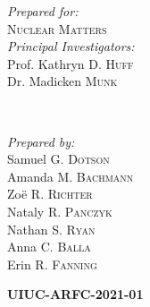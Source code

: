 \begin{titlepage}
       \begin{minipage}{0.45\textwidth}
               \begin{flushleft}
                       \large
                       \textit{Prepared for:}\\
                       \textsc{Nuclear Matters}%
                       \vspace{4mm}\\ %
                       \textit{Principal Investigators:}\\ %
                       Prof. Kathryn D. \textsc{Huff}\\ %
                       Dr. Madicken \textsc{Munk} %
                \end{flushleft}
       \end{minipage}
       ~
       \begin{minipage}{0.45\textwidth}
               \begin{flushright}
                       \large
                       \textit{Prepared by:}\\
                       Samuel G. \textsc{Dotson}\\ %
                       Amanda M. \textsc{Bachmann}\\ %
                       Zo\"{e} R. \textsc{Richter}\\ %
                       Nataly R. \textsc{Panczyk}\\ %
                       Nathan S. \textsc{Ryan}\\ %
                       Anna C. \textsc{Balla}\\ %
                       Erin R. \textsc{Fanning}
               \end{flushright}
    \end{minipage}


    \vspace{.5cm}
    \textsc{\LARGE\bfseries UIUC-ARFC-2021-01} %
    \vspace{0.2cm}


\end{titlepage}
